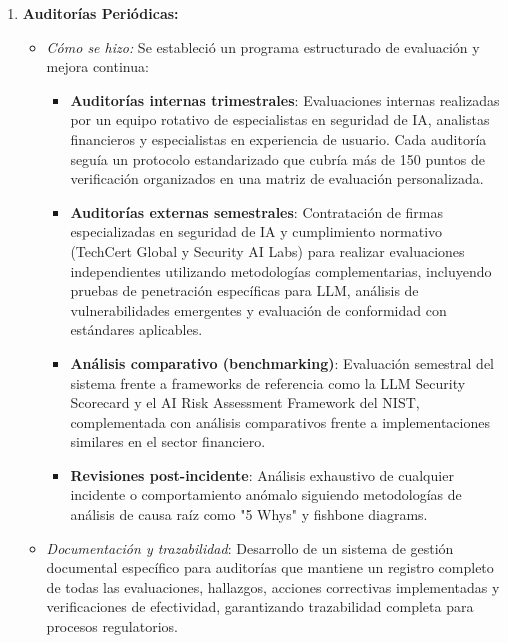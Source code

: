 \documentclass[12pt]{article}
\begin{document}
\begin{enumerate}
\begin{itemize}
            \item \textit{Propósito:} Este sistema integral proporciona visibilidad continua sobre el comportamiento del LLM, permitiendo la detección temprana y respuesta a problemas potenciales, en línea con el Art. 7.2.3 de la ISO/IEC 23894:2023 que establece requisitos para "monitoreo continuo con capacidad de respuesta inmediata".
        \end{itemize}
    \item \textbf{Auditorías Periódicas:}
        \begin{itemize}
            \item \textit{Cómo se hizo:} Se estableció un programa estructurado de evaluación y mejora continua:
            \begin{itemize}
                \item \textbf{Auditorías internas trimestrales}: Evaluaciones internas realizadas por un equipo rotativo de especialistas en seguridad de IA, analistas financieros y especialistas en experiencia de usuario. Cada auditoría seguía un protocolo estandarizado que cubría más de 150 puntos de verificación organizados en una matriz de evaluación personalizada.
                \item \textbf{Auditorías externas semestrales}: Contratación de firmas especializadas en seguridad de IA y cumplimiento normativo (TechCert Global y Security AI Labs) para realizar evaluaciones independientes utilizando metodologías complementarias, incluyendo pruebas de penetración específicas para LLM, análisis de vulnerabilidades emergentes y evaluación de conformidad con estándares aplicables.
                \item \textbf{Análisis comparativo (benchmarking)}: Evaluación semestral del sistema frente a frameworks de referencia como la LLM Security Scorecard y el AI Risk Assessment Framework del NIST, complementada con análisis comparativos frente a implementaciones similares en el sector financiero.
                \item \textbf{Revisiones post-incidente}: Análisis exhaustivo de cualquier incidente o comportamiento anómalo siguiendo metodologías de análisis de causa raíz como "5 Whys" y fishbone diagrams.
            \end{itemize}
            \item \textit{Documentación y trazabilidad}: Desarrollo de un sistema de gestión documental específico para auditorías que mantiene un registro completo de todas las evaluaciones, hallazgos, acciones correctivas implementadas y verificaciones de efectividad, garantizando trazabilidad completa para procesos regulatorios.

\end{itemize}
\end{enumerate}
\end{document}
